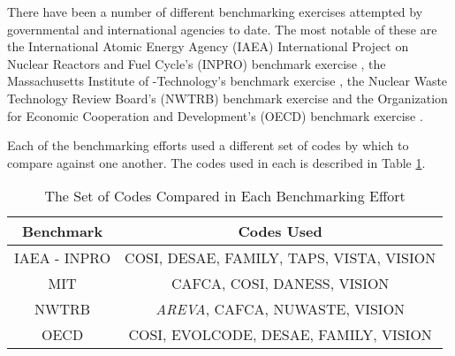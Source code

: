 There have been a number of different benchmarking exercises attempted by
governmental and international agencies to date. The most notable of these are
the International Atomic Energy Agency (IAEA) International Project on Nuclear
Reactors and Fuel Cycle's (INPRO) benchmark exercise \cite{_international_2009},
the Massachusetts Institute of -Technology's benchmark exercise
\cite{guerin_benchmark_2009}, the Nuclear Waste Technology Review Board's
(NWTRB) benchmark exercise \cite{abkowitz_workshop_2011,_nuclear_2011} and the
Organization for Economic Cooperation and Development's (OECD) benchmark
exercise \cite{boucher_benchmark_2012}.

Each of the benchmarking efforts used a different set of codes by which to
compare against one another. The codes used in each is described in
Table \ref{tab:benchmark-codes}.

\begin{table} [h!]
\centering
\begin{tabular} {|c|c|} 
\hline
Benchmark    & Codes Used \\
\hline
IAEA - INPRO & COSI, DESAE, FAMILY, TAPS, VISTA, VISION \\
MIT          & CAFCA, COSI, DANESS, VISION \\
NWTRB        & \textit{AREVA}, CAFCA, NUWASTE, VISION \\
OECD         & COSI, EVOLCODE, DESAE, FAMILY, VISION \\
\hline
\end{tabular}
\caption{The Set of Codes Compared in Each Benchmarking Effort}
\label{tab:benchmark-codes}
\end{table}

